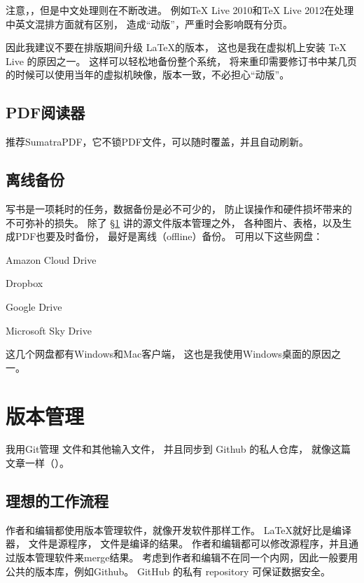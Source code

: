 注意，，但是中文处理则在不断改进。
例如TeX Live 2010和TeX Live 2012在处理中英文混排方面就有区别，
造成“动版”，严重时会影响既有分页。

\vspace{1ex}
\centerline{}

\vspace{1ex}
\centerline{}

\vspace{1ex}
因此我建议不要在排版期间升级 \LaTeX 的版本，
这也是我在虚拟机上安装 TeX Live 的原因之一。
这样可以轻松地备份整个系统，
将来重印需要修订书中某几页的时候可以使用当年的虚拟机映像，版本一致，不必担心“动版”。

\subsection{PDF阅读器}
推荐SumatraPDF，它不锁PDF文件，可以随时覆盖，并且自动刷新。

\subsection{离线备份}
写书是一项耗时的任务，数据备份是必不可少的，
防止误操作和硬件损坏带来的不可弥补的损失。
除了 \S \ref{sec:versionControl} 讲的源文件版本管理之外，
各种图片、表格，以及生成PDF也要及时备份，
最好是离线（offline）备份。
可用以下这些网盘：

\begindot
\item Amazon Cloud Drive
\item Dropbox
\item Google Drive
\item Microsoft Sky Drive
\myenddot

这几个网盘都有Windows和Mac客户端，
这也是我使用Windows桌面的原因之一。

\section{版本管理}
\label{sec:versionControl}


我用Git管理  文件和其他输入文件，
并且同步到 Github 的私人仓库，
就像这篇文章一样（）。

\subsection{理想的工作流程}
作者和编辑都使用版本管理软件，就像开发软件那样工作。
\LaTeX 就好比是编译器，
 文件是源程序，
 文件是编译的结果。
作者和编辑都可以修改源程序，并且通过版本管理软件来merge结果。
考虑到作者和编辑不在同一个内网，因此一般要用公共的版本库，例如Github。
GitHub 的私有 repository 可保证数据安全。


